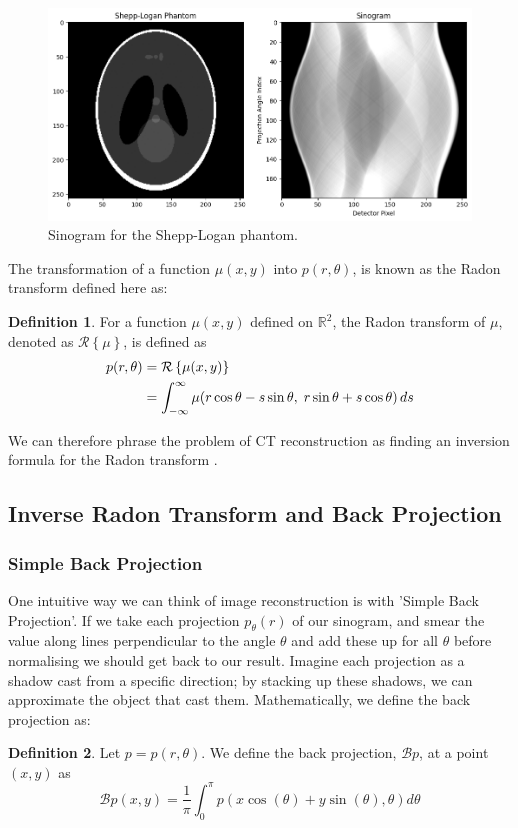 \documentclass{article}
\theoremstyle{definition}
\newtheorem{definition}{Definition}[section]
\begin{document}
\begin{figure}[H]
	\includegraphics[scale=0.5]{sinogramshepp.png}
	\caption{Sinogram for the Shepp-Logan phantom.}
	\label{fig:sinogramshepp}
\end{figure}

The transformation of a function $\mu (x,y)$ into $p(r, \theta)$, is known as the Radon transform defined here as:
\begin{definition}
For a function $\mu(x,y)$ defined on $\mathbb{R}^2$, the Radon transform of $\mu$, denoted as $\mathcal{R}\left\{\mu \right\}$, is defined as
\begin{align*}
p(r, \theta) &= \mathcal{R} \left\{ \mu(x,y) \right\} \notag \\
             &= \int_{-\infty}^{\infty} \mu(r \cos\theta - s \sin\theta,\; r \sin\theta + s \cos\theta) \, ds
\end{align*}
\label{radon}
\end{definition}
We can therefore phrase the problem of CT reconstruction as finding an inversion formula for the Radon transform \cite{Beatty2012}. 

\subsection{Inverse Radon Transform and Back Projection}
\subsubsection{Simple Back Projection}
One intuitive way we can think of image reconstruction is with 'Simple Back Projection'. If we take each projection $p_\theta (r)$ of our sinogram, and smear the value along lines perpendicular to the angle $\theta$ and add these up for all $\theta$ before normalising we should get back to our result. Imagine each projection as a shadow cast from a specific direction; by stacking up these shadows, we can approximate the object that cast them.
Mathematically, we define the back projection as:
\begin{definition}
Let $p = p(r, \theta)$. We define the back projection, $\mathcal{B} p$, at a point $(x,y)$ as
$$
\mathcal{B} p(x,y) = \frac{1}{\pi} \int_{0}^{\pi} p(x \cos(\theta) + y \sin(\theta), \theta) d\theta
$$
\end{definition}
\end{document}
